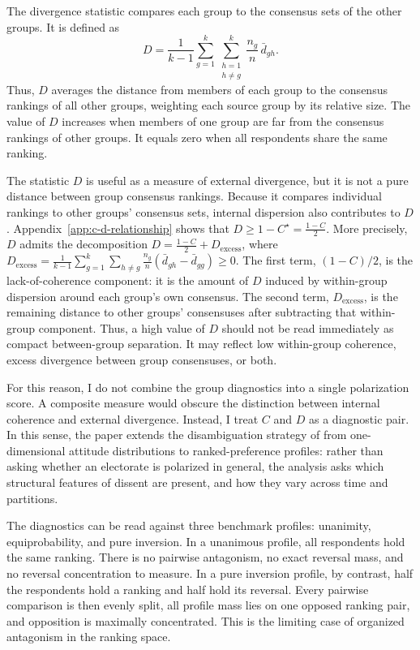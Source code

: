 \documentclass[12pt]{article}
\begin{document}
The divergence statistic compares each group to the consensus sets of
the other groups. It is defined as
\[
D
=
\frac{1}{k-1}
\sum_{g=1}^{k}
\sum_{\substack{h=1\\ h\neq g}}^{k}
\frac{n_g}{n}\,\bar d_{gh}.
\] Thus, \(D\) averages the distance from members of each group to the
consensus rankings of all other groups, weighting each source group by
its relative size. The value of \(D\) increases when members of one group
are far from the consensus rankings of other groups. It equals zero when
all respondents share the same ranking.

The statistic \(D\) is useful as a measure of external divergence, but it is not
a pure distance between group consensus rankings. Because it compares individual
rankings to other groups' consensus sets, internal dispersion also contributes
to \(D\). Appendix~\ref{app:c-d-relationship} shows that
\(D \geq 1-C^{\star} = \frac{1-C}{2}.\) More precisely, \(D\) admits the
decomposition \( D = \frac{1-C}{2} + D_{\mathrm{excess}}\), where
\( D_{\mathrm{excess}} = \frac{1}{k-1} \sum_{g=1}^{k} \sum_{h\neq g} \frac{n_g}{n} \left( \bar d_{gh}-\bar d_{gg} \right) \geq 0. \)
The first term, \((1-C)/2\), is the lack-of-coherence component: it is the
amount of \(D\) induced by within-group dispersion around each group's own
consensus. The second term, \(D_{\mathrm{excess}}\), is the remaining distance
to other groups' consensuses after subtracting that within-group component.
Thus, a high value of \(D\) should not be read immediately as compact
between-group separation. It may reflect low within-group coherence, excess
divergence between group consensuses, or both.

For this reason, I do not combine the group diagnostics into a single
polarization score. A composite measure would obscure the distinction between
internal coherence and external divergence. Instead, I treat \(C\) and \(D\) as
a diagnostic pair.  In this sense, the paper extends the
disambiguation strategy of \textcite{bramson2017understanding, bramson16_disam_social_polar_concep_measur} from one-dimensional attitude
distributions to ranked-preference profiles: rather than asking whether an
electorate is polarized in general, the analysis asks which structural features
of dissent are present, and how they vary across time and partitions.

The diagnostics can be read against three benchmark profiles: unanimity,
equiprobability, and pure inversion. In a unanimous profile, all respondents
hold the same ranking. There is no pairwise antagonism, no exact reversal mass,
and no reversal concentration to measure. In a pure inversion profile, by
contrast, half the respondents hold a ranking and half hold its reversal. Every
pairwise comparison is then evenly split, all profile mass lies on one opposed
ranking pair, and opposition is maximally concentrated. This is the limiting
case of organized antagonism in the ranking space.
\end{document}

